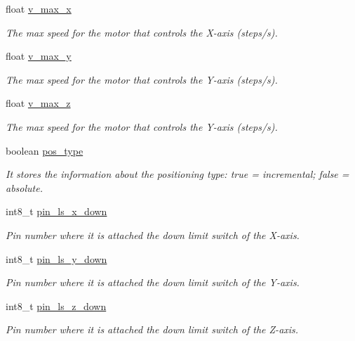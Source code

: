 \begin{DoxyCompactItemize}
float \hyperlink{class_c_n_c___router_afa08612e63f2cc3d3283fa06679b5d7a}{v\+\_\+max\+\_\+x}
\begin{DoxyCompactList}\small\item\em The max speed for the motor that controls the X-\/axis (steps/s). \end{DoxyCompactList}\item 
float \hyperlink{class_c_n_c___router_a5e3fe2fd85292f3f5d9d2e13078b6a42}{v\+\_\+max\+\_\+y}
\begin{DoxyCompactList}\small\item\em The max speed for the motor that controls the Y-\/axis (steps/s). \end{DoxyCompactList}\item 
float \hyperlink{class_c_n_c___router_a9e6e9d29184c011ec64e9648995af4cb}{v\+\_\+max\+\_\+z}
\begin{DoxyCompactList}\small\item\em The max speed for the motor that controls the Y-\/axis (steps/s). \end{DoxyCompactList}\item 
boolean \hyperlink{class_c_n_c___router_afd35356064c7667cbdf21c44a7dd7cf5}{pos\+\_\+type}
\begin{DoxyCompactList}\small\item\em It stores the information about the positioning type\+: true = incremental; false = absolute. \end{DoxyCompactList}\item 
int8\+\_\+t \hyperlink{class_c_n_c___router_a109a7c6e2a1e556e577f2ad09eefbef7}{pin\+\_\+ls\+\_\+x\+\_\+down}
\begin{DoxyCompactList}\small\item\em Pin number where it is attached the down limit switch of the X-\/axis. \end{DoxyCompactList}\item 
int8\+\_\+t \hyperlink{class_c_n_c___router_a19cd8e9840fbfab991f9cab1300abe04}{pin\+\_\+ls\+\_\+y\+\_\+down}
\begin{DoxyCompactList}\small\item\em Pin number where it is attached the down limit switch of the Y-\/axis. \end{DoxyCompactList}\item 
int8\+\_\+t \hyperlink{class_c_n_c___router_aa24cd537b5d08782fa01b055cea96c7d}{pin\+\_\+ls\+\_\+z\+\_\+down}
\begin{DoxyCompactList}\small\item\em Pin number where it is attached the down limit switch of the Z-\/axis. \end{DoxyCompactList}\item 

\end{DoxyCompactItemize}
